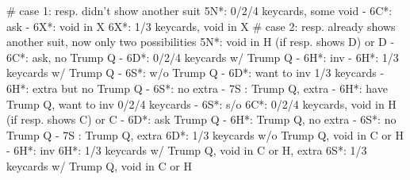 # case 1: resp. didn't show another suit
5N*: 0/2/4 keycards, some void
   - 6C*: ask
        - 6X*: void in X
6X*: 1/3 keycards, void in X
# case 2: resp. already shows another suit, now only two possibilities
5N*: void in H (if resp. shows D) or D
   - 6C*: ask, no Trump Q
        - 6D*: 0/2/4 keycards w/ Trump Q
             - 6H*: inv
        - 6H*: 1/3 keycards w/ Trump Q
        - 6S*: w/o Trump Q
   - 6D*: want to inv 1/3 keycards
        - 6H*: extra but no Trump Q
        - 6S*: no extra
        - 7S : Trump Q, extra
   - 6H*: have Trump Q, want to inv 0/2/4 keycards
   - 6S*: s/o
6C*: 0/2/4 keycards, void in H (if resp. shows C) or C
   - 6D*: ask Trump Q
        - 6H*: Trump Q, no extra
        - 6S*: no Trump Q
        - 7S : Trump Q, extra
6D*: 1/3 keycards w/o Trump Q, void in C or H
   - 6H*: inv
6H*: 1/3 keycards w/ Trump Q, void in C or H, extra
6S*: 1/3 keycards w/ Trump Q, void in C or H